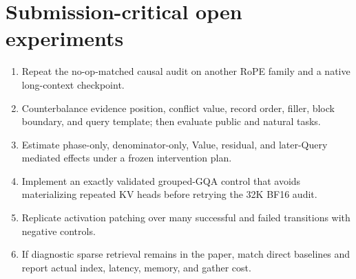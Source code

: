 \section{Submission-critical open experiments}
\label{app:todos}

\begin{enumerate}
  \scriptsize
  \setlength{\itemsep}{0pt}
  \setlength{\parskip}{0pt}
  \setlength{\parsep}{0pt}
  \setlength{\topsep}{0pt}
  \setlength{\partopsep}{0pt}
  \item Repeat the no-op-matched causal audit on another RoPE family and a
  native long-context checkpoint.
  \item Counterbalance evidence position, conflict value, record order, filler,
  block boundary, and query template; then evaluate public and natural tasks.
  \item Estimate phase-only, denominator-only, Value, residual, and later-Query
  mediated effects under a frozen intervention plan.
  \item Implement an exactly validated grouped-GQA control that avoids
  materializing repeated KV heads before retrying the 32K BF16 audit.
  \item Replicate activation patching over many successful and failed
  transitions with negative controls.
  \item If diagnostic sparse retrieval remains in the paper, match direct
  baselines and report actual index, latency, memory, and gather cost.
\end{enumerate}
